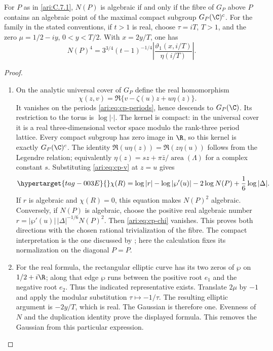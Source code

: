 \begin{proposition}\hypertarget{tag-001B}{}\label{ari:C.7.2}

For $P$ as in \cref{ari:C.7.1}, $N(P)$ is algebraic if and only
if the fibre of $G_P$ above $P$ contains an algebraic point of
the maximal compact subgroup $G_P(\C)^c$.
For the family in the stated conventions, if $t>1$ is real, choose
$\tau=iT$, $T>1$, and the zero $\mu=1/2-iy$, $0<y<T/2$.
With $x=2y/T$, one has
\[
 N(P)^4=3^{3/4}(t-1)^{-1/4}
       \left|\frac{\vartheta_1(x,i/T)}{\eta(i/T)}\right|.
\]
\end{proposition}


\begin{proof}
\begin{enumerate}[label=\arabic*.,leftmargin=*]
\item On the analytic universal cover of $G_P$ define the real
homomorphism
\[
 \chi(z,v)=\Re\{v-\zeta(u)z+u\eta(z)\}.
\]
It vanishes on the periods \eqref{ari:eq:cp-periods}, hence descends
to $G_P(\C)$. Its restriction to the torus is $\log|\cdot|$.
The kernel is compact: in the universal cover it is a real
three-dimensional vector space modulo the rank-three period
lattice. Every compact subgroup has zero image in $\R$, so
this kernel is exactly $G_P(\C)^c$.
The identity
$\Re(u\eta(z))=\Re(z\eta(u))$ follows from the Legendre relation;
equivalently $\eta(z)=sz+\pi\bar z/\operatorname{area}(\Lambda)$
for a complex constant $s$. Substituting
\eqref{ari:eq:cp-v} at $z=u$ gives
\begin{equation}\hypertarget{tag-003E}{}\label{ari:eq:cp-chi}
 \chi(R)=\log|r|-\log|\wp'(u)|
            -2\log N(P)+\frac16\log|\Delta|.
\end{equation}
If $r$ is algebraic and $\chi(R)=0$, this equation makes
$N(P)^2$ algebraic. Conversely, if $N(P)$ is algebraic,
choose the positive real algebraic number
$r=|\wp'(u)|\,|\Delta|^{-1/6}N(P)^2$.
Then \eqref{ari:eq:cp-chi} vanishes. This proves both directions
with the chosen rational trivialization of the fibre.
The compact interpretation is the one discussed by
\citet[PDF slides~5--8]{bertrand2017}; here the calculation fixes
its normalization on the diagonal $P=P$.

\item For the real formula, the rectangular elliptic curve has its
two zeros of $\wp$ on $1/2+i\R$; along that edge $\wp$ runs
between the positive root $e_1$ and the negative root $e_2$.
Thus the indicated representative exists. Translate $2\mu$
by $-1$ and apply the modular substitution $\tau\mapsto-1/\tau$.
The resulting elliptic argument is $-2y/T$, which is real.
The Gaussian is therefore one. Evenness of $N$ and the
duplication identity prove the displayed formula. This removes
the Gaussian from this particular expression.
\end{enumerate}
\end{proof}
